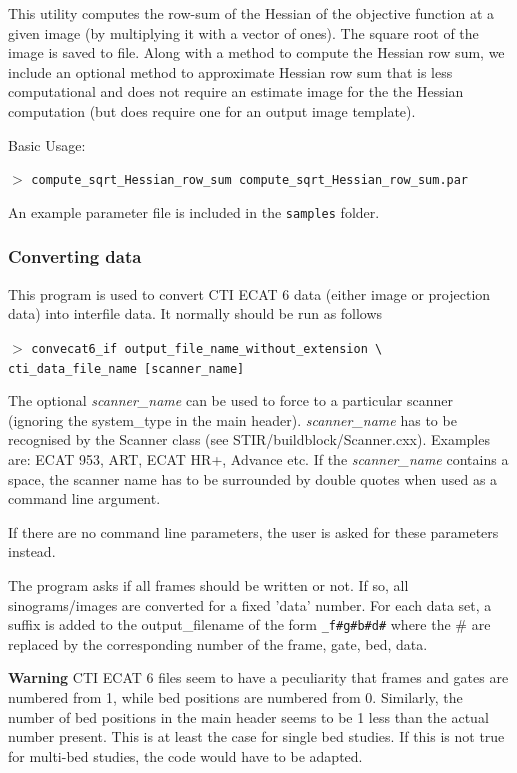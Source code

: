 \documentclass{article}
\newcommand{\cmdline}[1]{\par \noindent $>$ \texttt{#1}\par}
\begin{document}
{{This utility computes the row-sum of the Hessian of the objective function at a given image (by multiplying it with a vector of ones). The square root of the image is saved to file. Along with a method
to compute the Hessian row sum, we include an optional method to approximate Hessian row sum that is less computational
and does not require an estimate image for the the Hessian computation (but does require one for an output image
template).

Basic Usage:
\cmdline{compute\_sqrt\_Hessian\_row\_sum compute\_sqrt\_Hessian\_row\_sum.par}
An example parameter file is included in the \texttt{samples} folder.

\subsubsection{
Converting data}
\label{sec:convertingdata}
This program is used to convert CTI ECAT 6 data (either image 
or projection data) into interfile data. It normally should be 
run as follows
\cmdline{convecat6\_if output\_file\_name\_without\_extension {\textbackslash}\\
cti\_data\_file\_name [scanner\_name]}


The optional \textit{scanner\_name} can be used to force to a particular 
scanner (ignoring the system\_type in the main header). \textit{scanner\_name} 
has to be recognised by the Scanner class (see STIR/buildblock/Scanner.cxx). 
Examples are: ECAT 953, ART, ECAT HR+, Advance etc. If the \textit{scanner\_name} 
contains a space, the scanner name has to be surrounded by double 
quotes  when used as a command line argument.


If there are no command line parameters, the user is asked for 
these parameters instead. 


The program asks if all frames should be written or not. If so, 
all sinograms/images are converted for a fixed 'data' number. 
For each data set, a suffix is added to the output\_filename 
of the form \texttt{\_f\#g\#b\#d\#} where the \# are replaced 
by the corresponding number of the frame, gate, bed, data.



\textbf{Warning} CTI ECAT 6 files seem to have a peculiarity that 
frames and gates are numbered from 1, while bed positions are 
numbered from 0. Similarly, the number of bed positions in the 
main header seems to be 1 less than the actual number present. 
This is at least the case for single bed studies. If this is 
not true for multi-bed studies, the code would have to be adapted.


}}
\end{document}
